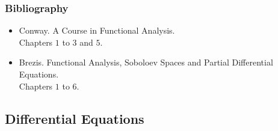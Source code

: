 \documentclass[spanish]{article}
\begin{document}
\subsubsection{Bibliography}
\begin{itemize}
  \item Conway. A Course in Functional Analysis.\\
    Chapters $1$ to $3$ and $5$.
  \item Brezis. Functional Analysis, Soboloev Spaces and Partial Differential Equations.\\
    Chapters $1$ to $6$.
\end{itemize}


\hrulefill%
\subsection{Differential Equations}
\end{document}
